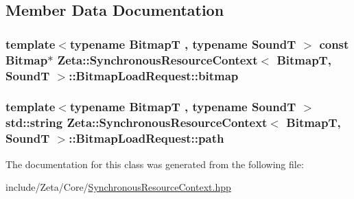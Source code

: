 \subsection{Member Data Documentation}
\hypertarget{classZeta_1_1SynchronousResourceContext_1_1BitmapLoadRequest_ae376e7355bdd78c46198009e88709c90}{
\subsubsection[{bitmap}]{\setlength{\rightskip}{0pt plus 5cm}template$<$typename Bitmap\+T , typename Sound\+T $>$ const {\bf Bitmap}$\ast$ {\bf Zeta\+::\+Synchronous\+Resource\+Context}$<$ Bitmap\+T, Sound\+T $>$\+::Bitmap\+Load\+Request\+::bitmap\hspace{0.3cm}{\ttfamily [private]}}}\label{classZeta_1_1SynchronousResourceContext_1_1BitmapLoadRequest_ae376e7355bdd78c46198009e88709c90}
\hypertarget{classZeta_1_1SynchronousResourceContext_1_1BitmapLoadRequest_a4c4c292da6fd58426599a99034152002}{
\subsubsection[{path}]{\setlength{\rightskip}{0pt plus 5cm}template$<$typename Bitmap\+T , typename Sound\+T $>$ std\+::string {\bf Zeta\+::\+Synchronous\+Resource\+Context}$<$ Bitmap\+T, Sound\+T $>$\+::Bitmap\+Load\+Request\+::path\hspace{0.3cm}{\ttfamily [private]}}}\label{classZeta_1_1SynchronousResourceContext_1_1BitmapLoadRequest_a4c4c292da6fd58426599a99034152002}


The documentation for this class was generated from the following file\+:\begin{DoxyCompactItemize}
\item 
include/\+Zeta/\+Core/\hyperlink{SynchronousResourceContext_8hpp}{Synchronous\+Resource\+Context.\+hpp}\end{DoxyCompactItemize}
